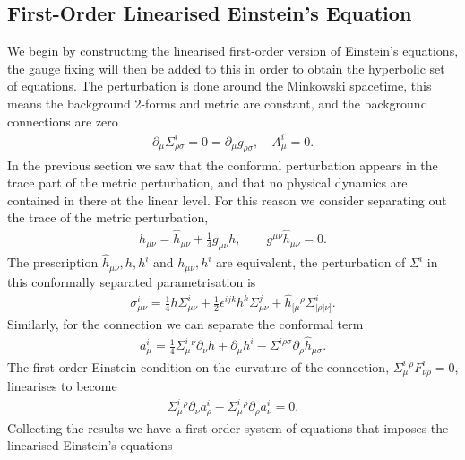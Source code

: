 \documentclass[10pt]{report}
\theoremstyle{definition}
\begin{document}
    \subsection{First-Order Linearised Einstein's Equation}
    We begin by constructing the linearised first-order version of Einstein's equations, the gauge fixing will then be added to this in order to obtain the hyperbolic set of equations. The perturbation is done around the Minkowski spacetime, this means the background 2-forms and metric are constant, and the background connections are zero 
    \begin{align}
        \partial_\mu \Sigma^i_{\rho\sigma} = 0 = \partial_\mu g_{\rho\sigma}, \quad A^i_\mu = 0.
    \end{align}
    In the previous section we saw that the conformal perturbation appears in the trace part of the metric perturbation, and that no physical dynamics are contained in there at the linear level. For this reason we consider separating out the trace of the metric perturbation,
    \begin{align}
        h_{\mu\nu} = \hat{h}_{\mu\nu} + \frac{1}{4} g_{\mu\nu} h, \qquad g^{\mu\nu} \hat{h}_{\mu\nu} = 0.
    \end{align}
    The prescription $\hat{h}_{\mu\nu}, h, h^i$ and $h_{\mu\nu}, h^i$ are equivalent, the perturbation of $\Sigma^i$ in this conformally separated parametrisation is 
    \begin{align} \label{eq:lin-2-form-pert-in-irreducibles-frame-comps}
        \sigma^i_{\mu\nu} = \frac{1}{4} h \Sigma^i_{\mu\nu} + \frac{1}{2} \epsilon^{ijk} h^k \Sigma^j_{\mu\nu} + \hat{h}_{[\mu}{}^\rho \Sigma^i_{|\rho|\nu]}.
    \end{align}
    Similarly, for the connection we can separate the conformal term
    \begin{align} \label{eq:lin-sd-connection-pert-in-irrep-frame-comps}
        a^i_\mu = \frac{1}{4} \Sigma^i_\mu{}^\nu \partial_\nu h + \partial_\mu h^i - \Sigma^{i\rho\sigma} \partial_\rho \hat{h}_{\mu\sigma}.
    \end{align}
    The first-order Einstein condition on the curvature of the connection, $\Sigma^i_\mu{}^\rho F^i_{\nu\rho} = 0$, linearises to become
    \begin{align}
        \Sigma^i_\mu{}^\rho \partial_\nu a^i_\rho - \Sigma^i_\mu{}^\rho \partial_\rho a^i_\nu = 0.
    \end{align}
    Collecting the results we have a first-order system of equations that imposes the linearised Einstein's equations 
\end{document}
